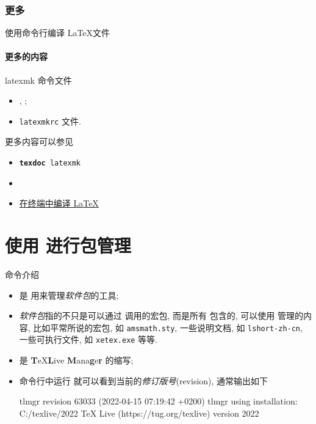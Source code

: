 \subsubsection{更多}

\begin{frame}{使用命令行编译 \LaTeX 文件}
  \framesubtitle{更多的内容}
  latexmk 命令文件
  \begin{itemize}
    \item {}, ;
    \item \texttt{latexmkrc} 文件.
  \end{itemize}
  
  更多内容可以参见
  \begin{itemize}
    \item \texttt{\textbf{texdoc} latexmk}
    \item {}
    \item \href{https://syvshc.github.io/2022-03-06-latex-terminal-compiling/}{在终端中编译 \LaTeX}
  \end{itemize}
\end{frame}

\section{使用 \tlmgr 进行包管理}

\begin{frame}[fragile]{\tlmgr 命令介绍}
\begin{itemize}
  \item \tlmgr 是 \texlive 用来管理\emph{软件包}的工具;
  \item \emph{软件包}指的不只是可以通过 \lcmd{\usepackage} 调用的宏包, 而是所有 \texlive 包含的, 可以使用 \tlmgr 管理的内容, 比如平常所说的宏包, 如 \lstinline{amsmath.sty}, 一些说明文档, 如 \lstinline{lshort-zh-cn}, 一些可执行文件, 如 \lstinline{xetex.exe} 等等.
  \item \tlmgr 是 \textbf{T}eX\textbf{L}ive \textbf{M}ana\textbf{g}e\textbf{r} 的缩写;
  \item 命令行中运行  就可以看到当前的\emph{修订版号}(revision), 通常输出如下
  \begin{outputcode}
  tlmgr revision 63033 (2022-04-15 07:19:42 +0200)
  tlmgr using installation: C:/texlive/2022
  TeX Live (https://tug.org/texlive) version 2022
  \end{outputcode}
\end{itemize}
\end{frame}


